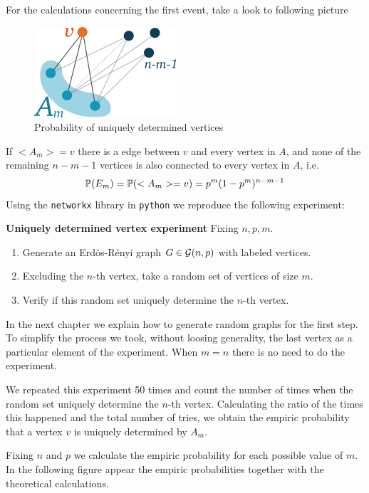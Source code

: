 For the calculations concerning the first event, take a look to following picture

\begin{figure}[h!]
	\centering
	\includegraphics[scale=1]{Figures/uni.png}
	\caption{Probability of uniquely determined vertices}
\end{figure}

If $<A_{m}> = v$ there is a edge between $v$ and every vertex in $A$, and none of the remaining $n-m-1$ vertices is also connected to every vertex in $A$, i.e.
$$\P (E_m) = \P(<A_{m}> = v) = p^{m}(1-p^{m})^{n-m-1}$$
Using the \texttt{networkx} library in \texttt{python} we reproduce the following experiment:
 
\begin{cajita}
\textbf{Uniquely determined vertex experiment} \hfill \break
Fixing $n,p,m$.
\begin{enumerate}
\item Generate an Erdös-Rényi graph $G\in \G(n,p)$ with labeled vertices.
\item Excluding the $n$-th vertex, take a random set of vertices of size $m$.
\item Verify if this random set uniquely determine the $n$-th vertex.
\end{enumerate}
\end{cajita}

In the next chapter we explain how to generate random graphs for the first step. To simplify the process we took, without loosing generality, the last vertex as a particular element of the experiment. When $m=n$ there is no need to do the experiment.

We repeated this experiment 50 times and count the number of times when the random set uniquely determine the $n$-th vertex. Calculating the ratio of the times this happened and the total number of tries, we obtain the empiric probability that a vertex $v$ is uniquely determined by $A_{m}$. 

Fixing $n$ and $p$ we calculate the empiric probability for each possible value of $m$. In the following figure appear the empiric probabilities together with the theoretical calculations.

